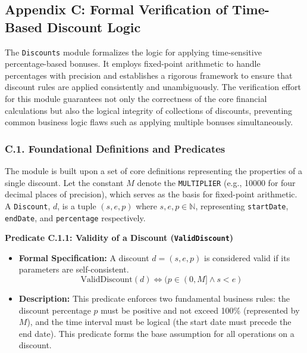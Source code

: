 \documentclass[
  english,
  onecolumn]{article}
\providecommand{\tightlist}{%
  \setlength{\itemsep}{0pt}\setlength{\parskip}{0pt}}
\begin{document}
\subsection{Appendix C: Formal Verification of Time-Based Discount
Logic}\label{appendix-c-formal-verification-of-time-based-discount-logic}

The \texttt{Discounts} module formalizes the logic for applying
time-sensitive percentage-based bonuses. It employs fixed-point
arithmetic to handle percentages with precision and establishes a
rigorous framework to ensure that discount rules are applied
consistently and unambiguously. The verification effort for this module
guarantees not only the correctness of the core financial calculations
but also the logical integrity of collections of discounts, preventing
common business logic flaws such as applying multiple bonuses
simultaneously.

\subsubsection{C.1. Foundational Definitions and
Predicates}\label{c.1.-foundational-definitions-and-predicates}

The module is built upon a set of core definitions representing the
properties of a single discount. Let the constant \(M\) denote the
\texttt{MULTIPLIER} (e.g., 10000 for four decimal places of precision),
which serves as the basis for fixed-point arithmetic. A
\texttt{Discount}, \(d\), is a tuple \((s, e, p)\) where
\(s, e, p \in \mathbb{N}\), representing \texttt{startDate},
\texttt{endDate}, and \texttt{percentage} respectively.

\textbf{Predicate C.1.1: Validity of a Discount
(\texttt{ValidDiscount})}

\begin{itemize}
\tightlist
\item
  \textbf{Formal Specification:} A discount \(d = (s, e, p)\) is
  considered valid if its parameters are self-consistent.
  \[ \text{ValidDiscount}(d) \iff (p \in (0, M] \land s < e) \]
\item
  \textbf{Description:} This predicate enforces two fundamental business
  rules: the discount percentage \(p\) must be positive and not exceed
  100\% (represented by \(M\)), and the time interval must be logical
  (the start date must precede the end date). This predicate forms the
  base assumption for all operations on a discount.
\end{itemize}
\end{document}
